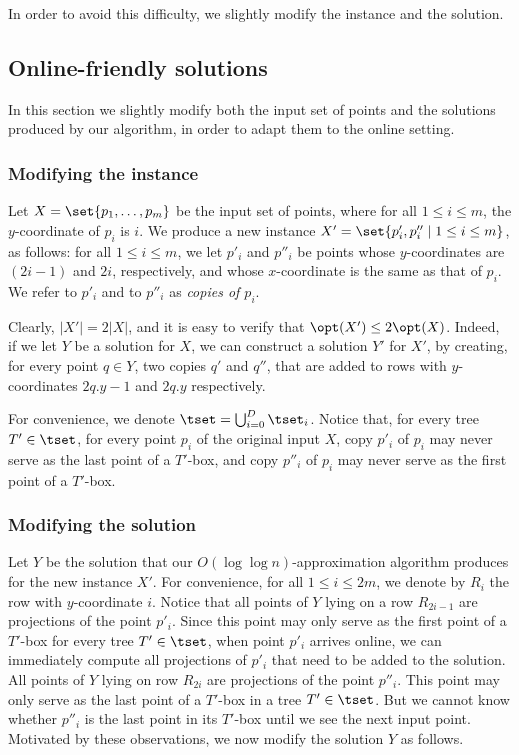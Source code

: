 \documentclass{toc}
\begin{document}
In order to avoid this difficulty, we slightly modify the instance and the solution. 


%
%


\subsection{Online-friendly solutions}
\label{sec: online-friendly}

In this section we slightly modify both the input set of points and the solutions produced by our algorithm, in order to adapt them to the online setting.

\subsubsection{Modifying the instance}

Let $X=\set{p_1,\ldots,p_m}$ be the input set of points, where for all $1\leq i\leq m$, the $y$-coordinate of $p_i$ is $i$. We produce a new instance $X'=\set{p_i',p_i''\mid 1\leq i\leq m}$, as follows: for all $1\leq i\leq m$, we let $p'_i$ and $p''_i$ be points whose $y$-coordinates are $(2i-1)$ and $2i$, respectively, and whose $x$-coordinate is the same as that of $p_i$. We refer to $p'_i$ and to $p''_i$ as \emph{copies of $p_i$}.
	
	Clearly, $|X'|=2|X|$, and it is easy to verify that $\opt(X')\leq 2\opt(X)$. Indeed, if we let $Y$ be a solution for $X$, we can construct a solution $Y'$ for $X'$, by creating, for every point $q\in Y$, two copies $q'$ and $q''$, that are added to rows with $y$-coordinates $2q.y-1$ and $2q.y$ respectively.

For convenience, we denote $\tset=\bigcup_{i=0}^D\tset_i$. Notice that, for every tree $T'\in \tset$, for every point $p_i$ of the original input $X$, copy $p'_i$ of $p_i$ may never serve as the last point of a $T'$-box, and copy $p''_i$ of $p_i$ may never serve as the first point of a $T'$-box.
	
	
\subsubsection{Modifying the solution}


Let $Y$ be the solution that our $O(\log\log n)$-approximation algorithm produces for the new instance $X'$. For convenience, for all $1\leq i\leq 2m$, we denote by $R_i$ the row with $y$-coordinate $i$. Notice that all points of $Y$ lying on a row $R_{2i-1}$ are projections of the point $p'_i$. Since this point may only serve as the first point of a $T'$-box for every tree $T'\in \tset$, when point $p'_i$ arrives online, we can immediately compute all projections of $p'_i$ that need to be added to the solution.
All points of $Y$ lying on row $R_{2i}$ are projections of the point $p''_i$. This point may only serve as the last point of a $T'$-box in a tree $T'\in \tset$. But we cannot know whether $p''_i$ is the last point in its $T'$-box until we see the next input point. Motivated by these observations, we now modify the solution $Y$ as follows.
\end{document}
